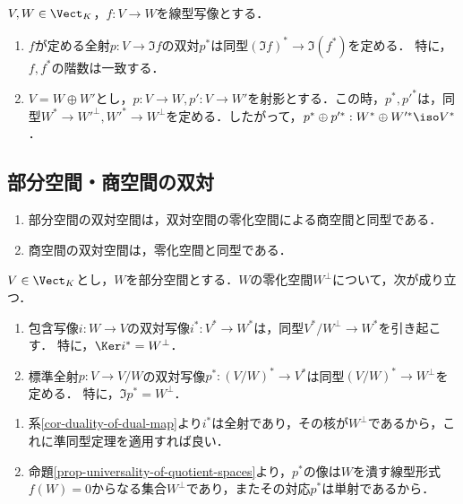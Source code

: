\documentclass[uplatex, dvipdfmx]{jsreport}
\begin{document}
\begin{corollary}[直交と双対]\label{cor-duality-of-dual-map}
    $V,W\in\Vect_K$，$f:V\to W$を線型写像とする．
    \begin{enumerate}
        \item $f$が定める全射$p:V\to \Im f$の双対$p^*$は同型$(\Im f)^*\to\Im(f^*)$を定める．
        特に，$f,f^*$の階数は一致する．
        \item $V=W\oplus W'$とし，$p:V\to W,p':V\to W'$を射影とする．この時，$p^*,p'^*$は，同型$W^*\to W'^\bot,W'^*\to W^\bot$を定める．したがって，$p^*\oplus p'^*:W^*\oplus W'^*\iso V^*$．
    \end{enumerate}
\end{corollary}

\subsection{部分空間・商空間の双対}

\begin{tcolorbox}[colframe=ForestGreen, colback=ForestGreen!10!white, breakable]
    \begin{enumerate}
        \item 部分空間の双対空間は，双対空間の零化空間による商空間と同型である．
        \item 商空間の双対空間は，零化空間と同型である．
    \end{enumerate}
\end{tcolorbox}

\begin{proposition}[零化空間は包含写像の双対の核かつ商写像の双対の像]\label{prop-fundamental-theorem-of-dual-maps}
    $V\in\Vect_K$とし，$W$を部分空間とする．$W$の零化空間$W^\bot$について，次が成り立つ．
    \begin{enumerate}
        \item 包含写像$i:W\to V$の双対写像$i^*:V^*\to W^*$は，同型$V^*/W^\bot\to W^*$を引き起こす．
        特に，$\Ker i^*=W^\perp$．
        \item 標準全射$p:V\to V/W$の双対写像$p^*:(V/W)^*\to V^*$は同型$(V/W)^*\to W^\bot$を定める．
        特に，$\Im p^*=W^\perp$．
    \end{enumerate}
\end{proposition}
\begin{Proof}\mbox{}
    \begin{enumerate}
        \item 系\ref{cor-duality-of-dual-map}より$i^*$は全射であり，その核が$W^\bot$であるから，これに準同型定理を適用すれば良い．
        \item 命題\ref{prop-universality-of-quotient-spaces}より，$p^*$の像は$W$を潰す線型形式$f(W)=0$からなる集合$W^\bot$であり，またその対応$p^*$は単射であるから．
    \end{enumerate}
\end{Proof}
\end{document}
